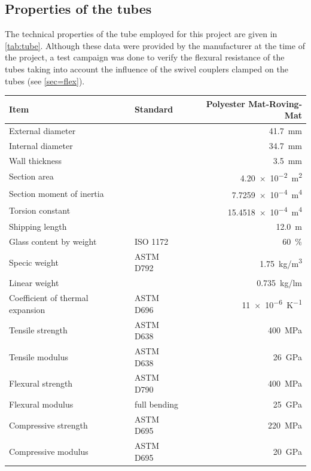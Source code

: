 \subsection{Properties of the tubes}\label{sec=gfrp}
The technical properties of the tube employed for this project are given in \cref{tab:tube}. Although these data were provided by the manufacturer at the time of the project, a test campaign was done to verify the flexural resistance of the tubes taking into account the influence of the swivel couplers clamped on the tubes (see \cref{sec=flex}).
\begin{table}[p]
\begin{fullpage}
\centering
 	\begin{tabular}{@{}l l r @{}}
	\toprule
	Item 							& Standard	 	& Polyester Mat-Roving-Mat \\
	\midrule
	External diameter 				&				& \SI{41.7}{\mm} \\
	Internal diameter 				& 				& \SI{34.7}{\mm} \\
	Wall thickness					& 				& \SI{3.5}{\mm} \\
	Section area					& 				& \SI{4.20e-2}{m^2} \\
	Section moment of inertia			&				& \SI{7.7259e-4}{m^4} \\
	Torsion constant				&				& \SI{15.4518e-4}{m^4} \\
	\midrule
	Shipping length 				& 				& \SI{12.0}{\m} \\
	Glass content by weight 			& ISO 1172		& \SI{60}{\percent}\\
	Specic weight					& ASTM D792		& \SI{1.75}{\kg/m^3}\\
	Linear weight					& 				& \SI{0.735}{\kg/lm}\\
	Coefficient of thermal expansion	& ASTM D696		& \SI{11e-6}{K^{-1}}\\
	\midrule
	Tensile strength					& ASTM D638		& \SI{400}{MPa}\\
	Tensile modulus				& ASTM D638		& \SI{26}{GPa}\\
	Flexural strength				& ASTM D790		& \SI{400}{MPa}\\
	Flexural modulus				& full bending		& \SI{25}{GPa}\\
	Compressive strength			& ASTM D695		& \SI{220}{MPa}\\
	Compressive modulus			& ASTM D695		& \SI{20}{GPa}\\

\end{tabular}
\end{fullpage}
\end{table}
